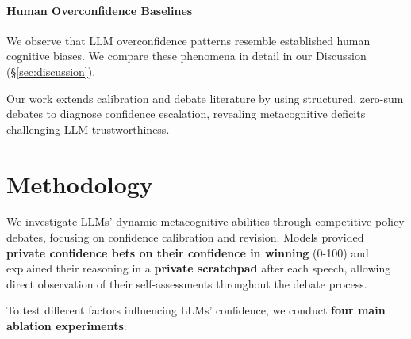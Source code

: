 \documentclass{article}
\begin{document}
\paragraph{Human Overconfidence Baselines}
We observe that LLM overconfidence patterns resemble established human cognitive biases. We compare these phenomena in detail in our Discussion (\S\ref{sec:discussion}).

Our work extends calibration and debate literature by using structured, zero-sum debates to diagnose confidence escalation, revealing metacognitive deficits challenging LLM trustworthiness.

\section{Methodology}
\label{sec:methodology}

We investigate LLMs' dynamic metacognitive abilities through competitive policy debates, focusing on confidence calibration and revision. Models provided \textbf{private confidence bets on their confidence in winning} (0-100) and explained their reasoning in a \textbf{private scratchpad} after each speech, allowing direct observation of their self-assessments throughout the debate process.

To test different factors influencing LLMs' confidence, we conduct \textbf{four main ablation experiments}:
\end{document}
